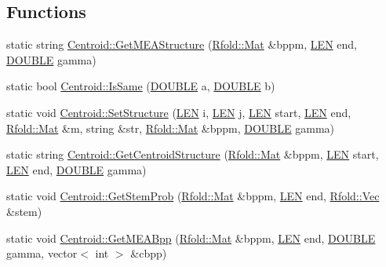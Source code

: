 \subsection*{Functions}
\begin{DoxyCompactItemize}
\item 
static string \hyperlink{namespace_centroid_a2472e4e4f8b057695c4dc82a1296a750}{Centroid\+::\+Get\+M\+E\+A\+Structure} (\hyperlink{namespace_rfold_a6392dbfbc164230455fdcdb1a0ff53d7}{Rfold\+::\+Mat} \&bppm, \hyperlink{energy__const_8hh_a05b49c662c073f89e86804f7856622a0}{L\+E\+N} end, \hyperlink{energy__const_8hh_a8747af38b86aa2bbcda2f1b1aa0888c2}{D\+O\+U\+B\+L\+E} gamma)
\item 
static bool \hyperlink{namespace_centroid_a1a72933cf1eb8e2db11025b2596a01a4}{Centroid\+::\+Is\+Same} (\hyperlink{energy__const_8hh_a8747af38b86aa2bbcda2f1b1aa0888c2}{D\+O\+U\+B\+L\+E} a, \hyperlink{energy__const_8hh_a8747af38b86aa2bbcda2f1b1aa0888c2}{D\+O\+U\+B\+L\+E} b)
\item 
static void \hyperlink{namespace_centroid_a23c4bcb9b477ed0b23bda10a19cf8794}{Centroid\+::\+Set\+Structure} (\hyperlink{energy__const_8hh_a05b49c662c073f89e86804f7856622a0}{L\+E\+N} i, \hyperlink{energy__const_8hh_a05b49c662c073f89e86804f7856622a0}{L\+E\+N} j, \hyperlink{energy__const_8hh_a05b49c662c073f89e86804f7856622a0}{L\+E\+N} start, \hyperlink{energy__const_8hh_a05b49c662c073f89e86804f7856622a0}{L\+E\+N} end, \hyperlink{namespace_rfold_a6392dbfbc164230455fdcdb1a0ff53d7}{Rfold\+::\+Mat} \&m, string \&str, \hyperlink{namespace_rfold_a6392dbfbc164230455fdcdb1a0ff53d7}{Rfold\+::\+Mat} \&bppm, \hyperlink{energy__const_8hh_a8747af38b86aa2bbcda2f1b1aa0888c2}{D\+O\+U\+B\+L\+E} gamma)
\item 
static string \hyperlink{namespace_centroid_a8acbc5a0352efc745aa7463bc0072314}{Centroid\+::\+Get\+Centroid\+Structure} (\hyperlink{namespace_rfold_a6392dbfbc164230455fdcdb1a0ff53d7}{Rfold\+::\+Mat} \&bppm, \hyperlink{energy__const_8hh_a05b49c662c073f89e86804f7856622a0}{L\+E\+N} start, \hyperlink{energy__const_8hh_a05b49c662c073f89e86804f7856622a0}{L\+E\+N} end, \hyperlink{energy__const_8hh_a8747af38b86aa2bbcda2f1b1aa0888c2}{D\+O\+U\+B\+L\+E} gamma)
\item 
static void \hyperlink{namespace_centroid_a1536a120dbc969d6a6702ae758427555}{Centroid\+::\+Get\+Stem\+Prob} (\hyperlink{namespace_rfold_a6392dbfbc164230455fdcdb1a0ff53d7}{Rfold\+::\+Mat} \&bppm, \hyperlink{energy__const_8hh_a05b49c662c073f89e86804f7856622a0}{L\+E\+N} end, \hyperlink{namespace_rfold_aaf02f2c0c40c1dd572dbdd8bc1bde67d}{Rfold\+::\+Vec} \&stem)
\item 
static void \hyperlink{namespace_centroid_a4bed069b4230a7f988bf8ed45b96a605}{Centroid\+::\+Get\+M\+E\+A\+Bpp} (\hyperlink{namespace_rfold_a6392dbfbc164230455fdcdb1a0ff53d7}{Rfold\+::\+Mat} \&bppm, \hyperlink{energy__const_8hh_a05b49c662c073f89e86804f7856622a0}{L\+E\+N} end, \hyperlink{energy__const_8hh_a8747af38b86aa2bbcda2f1b1aa0888c2}{D\+O\+U\+B\+L\+E} gamma, vector$<$ int $>$ \&cbpp)
\end{DoxyCompactItemize}

